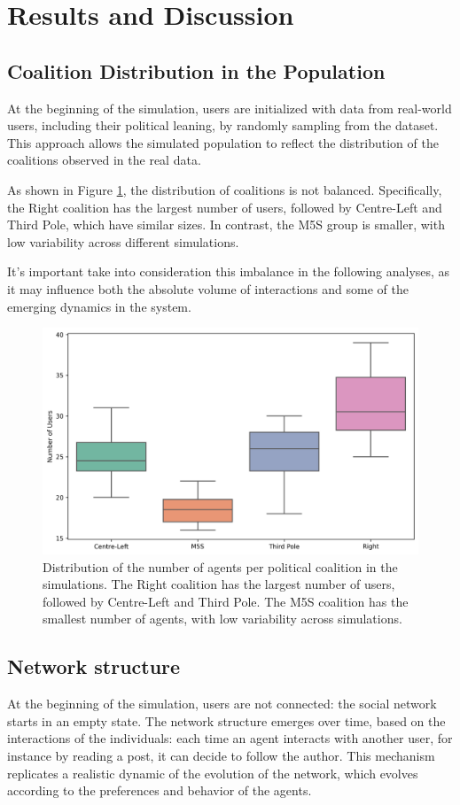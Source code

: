 \section{Results and Discussion}
\label{sec:discussion}


\subsection{Coalition Distribution in the Population}
At the beginning of the simulation, users are initialized with data from real-world users, including their political leaning, by randomly sampling from the dataset.
This approach allows the simulated population to reflect the distribution of the coalitions observed in the real data.

As shown in Figure \ref{fig:population}, the distribution of coalitions is not balanced.
Specifically, the Right coalition has the largest number of users, followed by Centre-Left and Third Pole, which have similar sizes.
In contrast, the M5S group is smaller, with low variability across different simulations.

It's important take into consideration this imbalance in the following analyses, as it may influence both the absolute volume of interactions and some of the emerging dynamics in the system.


\begin{figure}[h]
    \centering
    \includegraphics[width=0.6\linewidth]{Images/Network/population_composition_DefaultRecSys.png}
    \caption{Distribution of the number of agents per political coalition in the simulations.
    The Right coalition has the largest number of users, followed by Centre-Left and Third Pole.
    The M5S coalition has the smallest number of agents, with low variability across simulations.}
    \label{fig:population}
\end{figure}


\subsection{Network structure}
At the beginning of the simulation, users are not connected: the social network starts in an empty state.
The network structure emerges over time, based on the interactions of the individuals: each time an agent interacts with another user, for instance by reading a post, it can decide to follow the author.
This mechanism replicates a realistic dynamic of the evolution of the network, which evolves according to the preferences and behavior of the agents.

